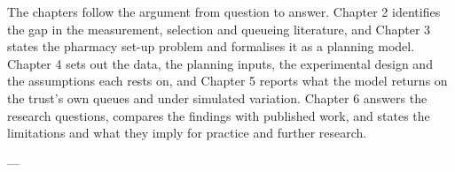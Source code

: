 The chapters follow the argument from question to answer. Chapter 2 identifies the gap in the measurement, selection and queueing literature, and Chapter 3 states the pharmacy set-up problem and formalises it as a planning model. Chapter 4 sets out the data, the planning inputs, the experimental design and the assumptions each rests on, and Chapter 5 reports what the model returns on the trust's own queues and under simulated variation. Chapter 6 answers the research questions, compares the findings with published work, and states the limitations and what they imply for practice and further research.

---

